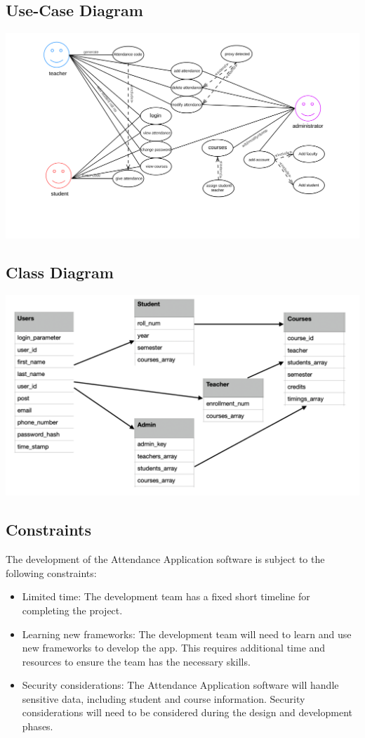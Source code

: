 \documentclass{scrreprt}
\begin{document}
\subsection{Use-Case Diagram}
\includegraphics[width=\linewidth]{use-case.png}
\subsection{Class Diagram}
\includegraphics[width=\linewidth]{"class diagram.png"}
\subsection{Constraints}
The development of the Attendance Application software is subject to the following constraints:
\begin{itemize}
\item Limited time: The development team has a fixed short timeline for completing the
project.
\item Learning new frameworks: The development team will need to learn and use new
frameworks to develop the app. This requires
additional time and resources to ensure the team has the necessary skills.
\item Security considerations: The Attendance Application software will handle sensitive data, including student and course information. Security considerations will need to be considered during the design and development phases.
\end{itemize}
\end{document}

